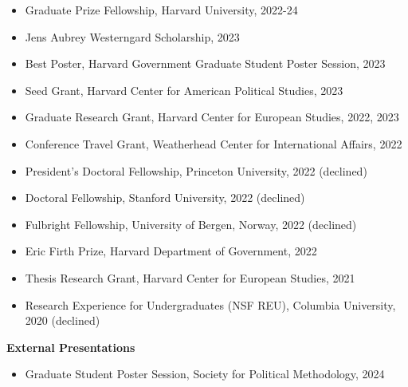 \documentclass[12pt]{article}
\begin{document}
\begin{footnotesize}
\begin{itemize}[noitemsep,nolistsep]
\item Graduate Prize Fellowship, Harvard University, 2022-24

\item Jens Aubrey Westerngard Scholarship, 2023

\item Best Poster, Harvard Government Graduate Student Poster Session, 2023

\item Seed Grant, Harvard Center for American Political Studies, 2023

\item Graduate Research Grant, Harvard Center for European Studies, 2022, 2023

\item Conference Travel Grant, Weatherhead Center for International Affairs, 2022

\item President's Doctoral Fellowship, Princeton University, 2022 (declined)

\item Doctoral Fellowship, Stanford University, 2022 (declined)

\item Fulbright Fellowship, University of Bergen, Norway, 2022 (declined)

\item Eric Firth Prize, Harvard Department of Government, 2022

\item Thesis Research Grant, Harvard Center for European Studies, 2021 

\item Research Experience for Undergraduates (NSF REU), Columbia University, 2020 (declined)

\end{itemize}

\vspace{5mm} 







{\bf {\normalsize External Presentations}}

\vspace{3mm} 

\begin{itemize}[noitemsep,nolistsep]

\item Graduate Student Poster Session, Society for Political Methodology, 2024


\end{itemize}
\end{footnotesize}
\end{document}
